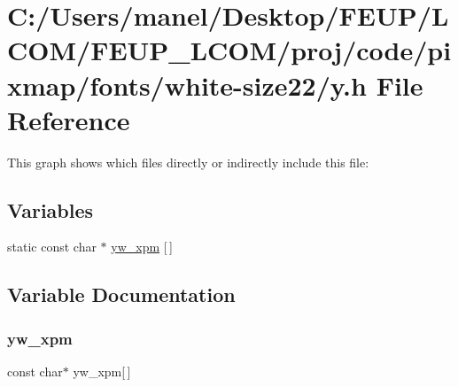 \hypertarget{white-size22_2y_8h}{}\section{C\+:/\+Users/manel/\+Desktop/\+F\+E\+U\+P/\+L\+C\+O\+M/\+F\+E\+U\+P\+\_\+\+L\+C\+O\+M/proj/code/pixmap/fonts/white-\/size22/y.h File Reference}
\label{white-size22_2y_8h}
This graph shows which files directly or indirectly include this file\+:
\subsection*{Variables}
\begin{DoxyCompactItemize}
\item 
static const char $\ast$ \mbox{\hyperlink{white-size22_2y_8h_ab72551908a0c802045f5aa024dd5c7ec}{yw\+\_\+xpm}} \mbox{[}$\,$\mbox{]}
\end{DoxyCompactItemize}


\subsection{Variable Documentation}
\mbox{\label{white-size22_2y_8h_ab72551908a0c802045f5aa024dd5c7ec}} 
\subsubsection{\texorpdfstring{yw\_xpm}{yw\_xpm}}
{\footnotesize\ttfamily const char$\ast$ yw\+\_\+xpm\mbox{[}$\,$\mbox{]}\hspace{0.3cm}{\ttfamily [static]}}

